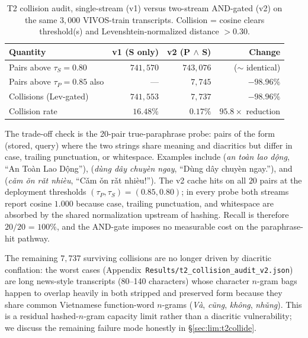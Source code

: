 \documentclass[a4paper,fleqn]{cas-dc}
\begin{document}
\begin{table}[!tb]
\caption{T2 collision audit, single-stream (v1) versus two-stream AND-gated (v2) on the same $3{,}000$ VIVOS-train transcripts. Collision = cosine clears threshold(s) and Levenshtein-normalized distance $> 0.30$.}\label{tab:t2_v2_audit}
\footnotesize
\begin{tabular*}{\columnwidth}{@{}lrrr@{}}
\toprule
Quantity & v1 (S only) & v2 (P $\wedge$ S) & Change \\
\midrule
Pairs above $\tau_{S}=0.80$ & $741{,}570$ & $743{,}076$ & ($\sim$ identical) \\
Pairs above $\tau_{P}=0.85$ also & --- & $7{,}745$ & $-98.96\%$ \\
Collisions (Lev-gated) & $741{,}553$ & $7{,}737$ & $-98.96\%$ \\
Collision rate & $16.48\%$ & $\mathbf{0.17\%}$ & $\mathbf{95.8\times}$ reduction \\
\bottomrule
\end{tabular*}
\end{table}

The trade-off check is the 20-pair true-paraphrase probe: pairs of the form (stored, query) where the two strings share meaning and diacritics but differ in case, trailing punctuation, or whitespace. Examples include (\emph{an to\`an lao d\d{\^o}ng}, ``An To\`an Lao D\d{\^o}ng''), (\emph{d\`ung d\^ay chuy\`en ngay}, ``D\`ung d\^ay chuy\`en ngay.''), and (\emph{c\v{a}m \v{o}n r\v{a}t nhi\`eu}, ``C\v{a}m \v{o}n r\v{a}t nhi\`eu!''). The v2 cache hits on all $20$ pairs at the deployment thresholds $(\tau_{P}, \tau_{S}) = (0.85, 0.80)$; in every probe both streams report cosine $1.000$ because case, trailing punctuation, and whitespace are absorbed by the shared normalization upstream of hashing. Recall is therefore $20/20$ = $100\%$, and the AND-gate imposes no measurable cost on the paraphrase-hit pathway.

The remaining $7{,}737$ surviving collisions are no longer driven by diacritic conflation: the worst cases (Appendix~\texttt{Results/t2\_collision\_audit\_v2.json}) are long news-style transcripts (80--140 characters) whose character $n$-gram bags happen to overlap heavily in both stripped and preserved form because they share common Vietnamese function-word $n$-grams (\emph{V\`a}, \emph{c\~ung}, \emph{kh\^ong}, \emph{nh\v{u}ng}). This is a residual hashed-$n$-gram capacity limit rather than a diacritic vulnerability; we discuss the remaining failure mode honestly in \S\ref{sec:lim:t2collide}.
\end{document}
